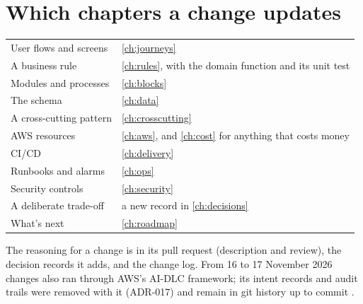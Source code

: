 \section{Which chapters a change updates}
\begin{xltabular}{\linewidth}{@{}P{58mm} L@{}}
  \toprule
   & \\
  \midrule
  User flows and screens & \cref{ch:journeys}\\
  A business rule & \cref{ch:rules}, with the domain function and its unit test\\
  Modules and processes & \cref{ch:blocks}\\
  The schema & \cref{ch:data}\\
  A cross-cutting pattern & \cref{ch:crosscutting}\\
  AWS resources & \cref{ch:aws}, and \cref{ch:cost} for anything that costs money\\
  CI/CD & \cref{ch:delivery}\\
  Runbooks and alarms & \cref{ch:ops}\\
  Security controls & \cref{ch:security}\\
  A deliberate trade-off & a new record in \cref{ch:decisions}\\
  What's next & \cref{ch:roadmap}\\
  \bottomrule
\end{xltabular}

\begin{auditnote}
  The reasoning for a change is in its pull request (description and review), the decision
  records it adds, and the change log. From 16 to 17 November 2026 changes also ran through AWS's
  AI-DLC framework; its intent records and audit trails were removed with it (ADR-017) and remain
  in git history up to commit .
\end{auditnote}
